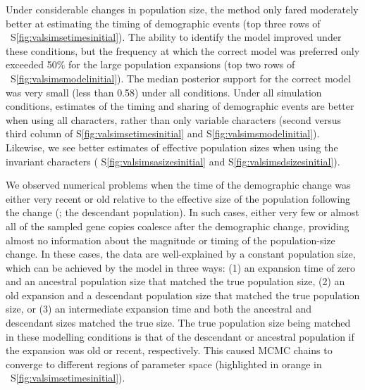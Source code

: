 Under considerable changes in population size, the method only fared
moderately better at estimating the timing of demographic events
(top three rows of \fig{}~S\ref{fig:valsimsetimesinitial}).
The ability to identify the model improved under these
conditions, but the frequency at which the correct model
was preferred only exceeded 50\% for the large population
expansions
(top two rows of \fig{}~S\ref{fig:valsimsmodelinitial}).
The median posterior support for the correct model was very small (less than
0.58) under all conditions.
Under all simulation conditions, estimates of the timing and sharing of
demographic events are better when using all characters, rather than only
variable characters
(second versus third column of \figs
S\ref{fig:valsimsetimesinitial}
and
S\ref{fig:valsimsmodelinitial}).
Likewise, we see better estimates of effective population sizes when using the
invariant characters
(\figs
S\ref{fig:valsimsasizesinitial}
and
S\ref{fig:valsimsdsizesinitial}).


We observed numerical problems when the time of the demographic change was
either very recent or old relative to the effective size of the population
following the change
(\epopsize[\descendantpopindex{}]; the descendant population).
In such cases, either very few or almost all of the sampled gene copies
coalesce after the demographic change,
providing almost no information about the magnitude or
timing of the population-size change.
In these cases, the data are well-explained by a constant population size,
which can be achieved by the model in three ways:
(1) an expansion time of zero and an ancestral population
size that matched the true population size,
(2) an old expansion and a descendant population size that matched the true
population size,
or (3) an intermediate expansion time and both the ancestral and descendant
sizes matched the true size.
The true population size being matched in these modelling conditions is that of
the descendant or ancestral population if the expansion was old or recent,
respectively.
This caused MCMC chains to converge to different regions of parameter
space
(highlighted in orange in \fig{}~S\ref{fig:valsimsetimesinitial}).

